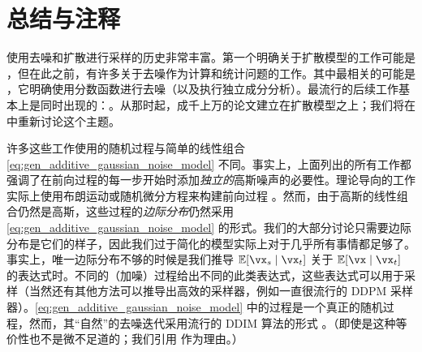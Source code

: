 \documentclass[../../book-main_zh.tex]{subfiles}
\begin{document}

\section{总结与注释}

使用去噪和扩散进行采样的历史非常丰富。第一个明确关于扩散模型的工作可能是 \cite{Sohl-Dickstein2015}，但在此之前，有许多关于去噪作为计算和统计问题的工作。其中最相关的可能是 \cite{hyvarinen05a}，它明确使用分数函数进行去噪（以及执行独立成分分析）。最流行的后续工作基本上是同时出现的：\cite{ho2020denoising,song2019}。从那时起，成千上万的论文建立在扩散模型之上；我们将在  中重新讨论这个主题。

许多这些工作使用的随机过程与简单的线性组合 \eqref{eq:gen_additive_gaussian_noise_model} 不同。事实上，上面列出的所有工作都强调了在前向过程的每一步开始时添加\textit{独立的}高斯噪声的必要性。理论导向的工作实际上使用布朗运动或随机微分方程来构建前向过程 \cite{song2020score}。然而，由于高斯的线性组合仍然是高斯，这些过程的\textit{边际分布}仍然采用 \eqref{eq:gen_additive_gaussian_noise_model} 的形式。我们的大部分讨论只需要边际分布是它们的样子，因此我们过于简化的模型实际上对于几乎所有事情都足够了。事实上，唯一边际分布不够的时候是我们推导 \(\Ex[\vx_{s} \mid \vx_{t}]\) 关于 \(\Ex[\vx \mid \vx_{t}]\) 的表达式时。不同的（加噪）过程给出不同的此类表达式，这些表达式可以用于采样（当然还有其他方法可以推导出高效的采样器，例如一直很流行的 DDPM 采样器）。\eqref{eq:gen_additive_gaussian_noise_model} 中的过程是一个真正的随机过程，然而，其“自然”的去噪迭代采用流行的 DDIM 算法的形式 \cite{song2020denoising}。（即使是这种等价性也不是微不足道的；我们引用 \cite{de2025distributional} 作为理由。）


\end{document}
